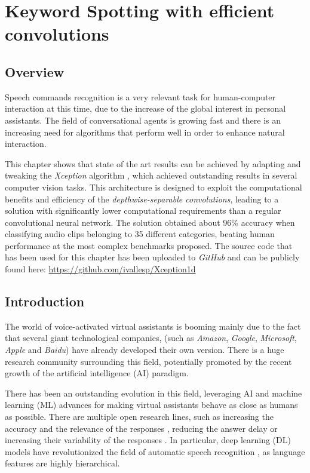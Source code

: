 \chapter{Keyword Spotting with efficient convolutions} \label{ch:kws}

\section{Overview}
Speech commands recognition is a very relevant task for human-computer interaction at this time, due to the increase of the global interest in personal assistants. The field of conversational agents is growing fast and there is an increasing need for algorithms that perform well in order to enhance natural interaction. 

This chapter shows that state of the art results can be achieved by adapting and tweaking the \textit{Xception} algorithm \autocite{chollet2017}, which achieved outstanding results in several computer vision tasks. This architecture is designed to exploit the computational benefits and efficiency of the \textit{depthwise-separable convolutions}, leading to a solution with significantly lower computational requirements than a regular convolutional neural network. The solution obtained about 96\% accuracy when classifying audio clips belonging to 35 different categories, beating human performance at the most complex benchmarks proposed.
 The source code that has been used for this chapter has been uploaded to \textit{GitHub} and can be publicly found here: \url{https://github.com/ivallesp/Xception1d}


\section{Introduction}
The world of voice-activated virtual assistants is booming mainly due to the fact that several giant technological companies, (such as \textit{Amazon}, \textit{Google}, \textit{Microsoft}, \textit{Apple} and \textit{Baidu}) have already developed their own version. There is a huge research community surrounding this field, potentially promoted by the recent growth of the artificial intelligence (AI) paradigm.

There has been an outstanding evolution in this field, leveraging AI and machine learning (ML) advances for  making virtual assistants behave as close as humans as possible. There are multiple open research lines, such as increasing the accuracy and the relevance of the responses \autocite{milabot2017}, reducing the answer delay \autocite{Han2017} or increasing their variability of the responses \autocite{Li2017}. In particular, deep learning (DL) models have revolutionized the field of automatic speech recognition \autocite{Nassif2019}, as language features are highly hierarchical. 

